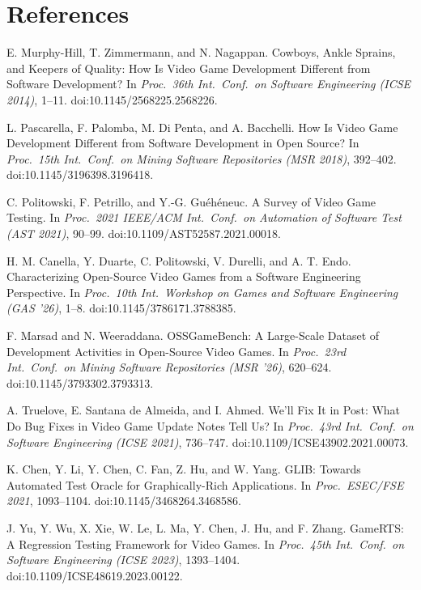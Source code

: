 \documentclass[10pt,twocolumn,a4paper]{article}
\begin{document}
\section*{References}
\small
\begin{enumerate}[label={[\arabic*]},leftmargin=2.2em,itemsep=1pt]
\item E. Murphy-Hill, T. Zimmermann, and N. Nagappan. Cowboys, Ankle Sprains, and Keepers of Quality: How Is Video Game Development Different from Software Development? In \emph{Proc.\ 36th Int.\ Conf.\ on Software Engineering (ICSE 2014)}, 1--11. doi:10.1145/2568225.2568226.
\item L. Pascarella, F. Palomba, M. Di Penta, and A. Bacchelli. How Is Video Game Development Different from Software Development in Open Source? In \emph{Proc.\ 15th Int.\ Conf.\ on Mining Software Repositories (MSR 2018)}, 392--402. doi:10.1145/3196398.3196418.
\item C. Politowski, F. Petrillo, and Y.-G. Gu\'eh\'eneuc. A Survey of Video Game Testing. In \emph{Proc.\ 2021 IEEE/ACM Int.\ Conf.\ on Automation of Software Test (AST 2021)}, 90--99. doi:10.1109/AST52587.2021.00018.
\item H. M. Canella, Y. Duarte, C. Politowski, V. Durelli, and A. T. Endo. Characterizing Open-Source Video Games from a Software Engineering Perspective. In \emph{Proc.\ 10th Int.\ Workshop on Games and Software Engineering (GAS '26)}, 1--8. doi:10.1145/3786171.3788385.
\item F. Marsad and N. Weeraddana. OSSGameBench: A Large-Scale Dataset of Development Activities in Open-Source Video Games. In \emph{Proc.\ 23rd Int.\ Conf.\ on Mining Software Repositories (MSR '26)}, 620--624. doi:10.1145/3793302.3793313.
\item A. Truelove, E. Santana de Almeida, and I. Ahmed. We'll Fix It in Post: What Do Bug Fixes in Video Game Update Notes Tell Us? In \emph{Proc.\ 43rd Int.\ Conf.\ on Software Engineering (ICSE 2021)}, 736--747. doi:10.1109/ICSE43902.2021.00073.
\item K. Chen, Y. Li, Y. Chen, C. Fan, Z. Hu, and W. Yang. GLIB: Towards Automated Test Oracle for Graphically-Rich Applications. In \emph{Proc.\ ESEC/FSE 2021}, 1093--1104. doi:10.1145/3468264.3468586.
\item J. Yu, Y. Wu, X. Xie, W. Le, L. Ma, Y. Chen, J. Hu, and F. Zhang. GameRTS: A Regression Testing Framework for Video Games. In \emph{Proc.\ 45th Int.\ Conf.\ on Software Engineering (ICSE 2023)}, 1393--1404. doi:10.1109/ICSE48619.2023.00122.
\end{enumerate}
\normalsize
\end{document}
